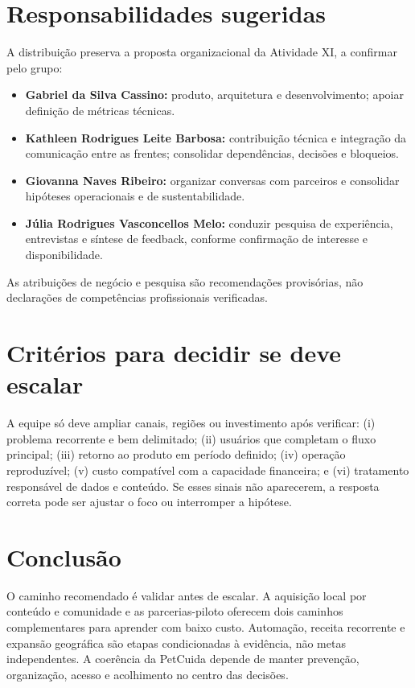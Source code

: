 \documentclass[12pt,a4paper]{article}
\begin{document}
\section{Responsabilidades sugeridas}
A distribuição preserva a proposta organizacional da Atividade XI, a confirmar pelo grupo:
\begin{itemize}[leftmargin=*]
\item \textbf{Gabriel da Silva Cassino:} produto, arquitetura e desenvolvimento; apoiar definição de métricas técnicas.
\item \textbf{Kathleen Rodrigues Leite Barbosa:} contribuição técnica e integração da comunicação entre as frentes; consolidar dependências, decisões e bloqueios.
\item \textbf{Giovanna Naves Ribeiro:} organizar conversas com parceiros e consolidar hipóteses operacionais e de sustentabilidade.
\item \textbf{Júlia Rodrigues Vasconcellos Melo:} conduzir pesquisa de experiência, entrevistas e síntese de feedback, conforme confirmação de interesse e disponibilidade.
\end{itemize}
As atribuições de negócio e pesquisa são recomendações provisórias, não declarações de competências profissionais verificadas.

\section{Critérios para decidir se deve escalar}
A equipe só deve ampliar canais, regiões ou investimento após verificar: (i) problema recorrente e bem delimitado; (ii) usuários que completam o fluxo principal; (iii) retorno ao produto em período definido; (iv) operação reproduzível; (v) custo compatível com a capacidade financeira; e (vi) tratamento responsável de dados e conteúdo. Se esses sinais não aparecerem, a resposta correta pode ser ajustar o foco ou interromper a hipótese.

\section{Conclusão}
O caminho recomendado é validar antes de escalar. A aquisição local por conteúdo e comunidade e as parcerias-piloto oferecem dois caminhos complementares para aprender com baixo custo. Automação, receita recorrente e expansão geográfica são etapas condicionadas à evidência, não metas independentes. A coerência da PetCuida depende de manter prevenção, organização, acesso e acolhimento no centro das decisões.
\end{document}
